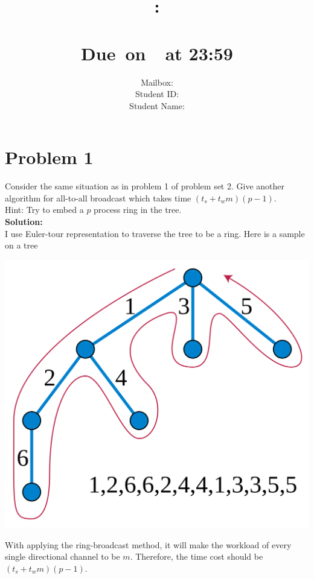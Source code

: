 \documentclass{article}
\title{
    \vspace{2in}
    \textmd{\textbf{\hmwkClass:\\  \hmwkTitle}}\\
    \normalsize\vspace{0.1in}\small{Due\ on\ \hmwkDueDate\ at 23:59 }\\
   \vspace{2in}
}
\author{
    Mailbox: \hmwkAuthorMail\\
	Student ID: \hmwkAuthorID\\
    Student Name: \hmwkAuthorName}
\date{}
\begin{document}
\maketitle
\pagebreak
\tableofcontents

\pagebreak





\section{Problem 1}
Consider the same situation as in problem 1 of problem set 2. Give another 
algorithm for all-to-all broadcast which takes time $(t_{s} + t_{w}m) (p-1)$.\\
Hint: Try to embed a $p$ process ring in the tree.\\
\textbf{Solution: }\\
I use Euler-tour representation to traverse the tree to be a ring. Here is a sample on a tree
\begin{center}
    \includegraphics[scale = 0.09]{6.png}\\
\end{center}
With applying the ring-broadcast method, it will make the workload of every single directional channel to be $m$. Therefore, the time cost should be $(t_{s}+t_{w}m)(p-1)$.
\end{document}
